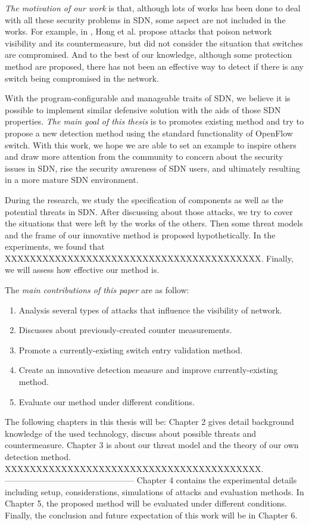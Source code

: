\emph{The motivation of our work} is that, although lots of works has been done to deal with all these security problems in SDN, some aspect are not included in the works. For example, in \cite{HXWG_15}, Hong et al. propose attacks that poison network visibility and its countermeasure, but did not consider the situation that switches are compromised. And to the best of our knowledge, although some protection method are proposed, there has not been an effective way to detect if there is any switch being compromised in the network. 

With the program-configurable and manageable traits of SDN, we believe it is possible to implement similar defensive solution with the aids of those SDN properties. \emph{The main goal of this thesis} is to promotes existing method and try to propose a new detection method using the standard functionality of OpenFlow switch. With this work, we hope we are able to set an example to inspire others and draw more attention from the community to concern about the security issues in SDN, rise the security awareness of SDN users, and ultimately resulting in a more mature SDN environment.

During the research, we study the specification of components as well as the potential threats in SDN. After discussing about those attacks, we try to cover the situations that were left by the works of the others. Then some threat models and the frame of our innovative method is proposed hypothetically. 
In the experiments, we found that XXXXXXXXXXXXXXXXXXXXXXXXXXXXXXXXXXXXXXXXX. Finally, we will assess how effective our method is.

The \emph{main contributions of this paper} are as follow:

\begin{enumerate}
\item
Analysis several types of attacks that influence the visibility of network.
\item
Discusses about previously-created counter measurements.
\item
Promote a currently-existing switch entry validation method.
\item
Create an innovative detection measure and improve currently-existing method.
\item
Evaluate our method under different conditions.
\end{enumerate}

The following chapters in this thesis will be: Chapter 2 gives detail background knowledge of the used technology, discuss about possible threats and countermeasure. Chapter 3 is about our threat model and the theory of our own detection method. XXXXXXXXXXXXXXXXXXXXXXXXXXXXXXXXXXXXXXXXX.
-----------------------------------------------
Chapter 4 contains the experimental details including setup, considerations, simulations of attacks and evaluation methods. In Chapter 5, the proposed method will be evaluated under different conditions. Finally, the conclusion and future expectation of this work will be in Chapter 6.